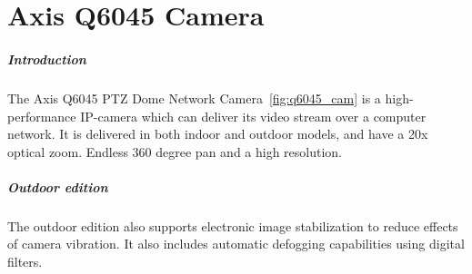 \chapter{Axis Q6045 Camera}
\paragraph{Introduction}
The Axis Q6045 PTZ Dome Network Camera~\ref{fig:q6045_cam} is a high-performance IP-camera which can deliver its video stream over a computer network. It is delivered in both indoor and outdoor models, and have a 20x optical zoom. Endless 360 degree pan and a high resolution.

\paragraph{Outdoor edition}
The outdoor edition also supports electronic image stabilization to reduce effects of camera vibration. It also includes automatic defogging capabilities using digital filters.

